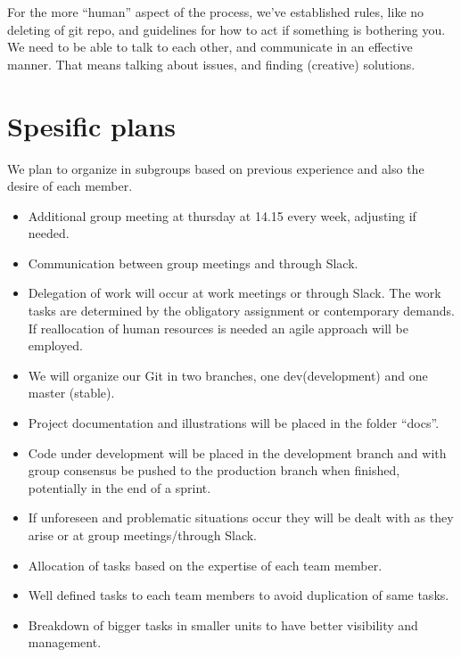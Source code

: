 \documentclass{article}
\begin{document}
For the more “human” aspect of the process, we’ve established rules, like no deleting of git repo, and guidelines for how to act if something is bothering you. We need to be able to talk to each other, and communicate in an effective manner. That means talking about issues, and finding (creative) solutions. 

\section*{Spesific plans}
 We plan to organize in subgroups based on previous experience and also the desire of each member.

\begin{itemize}
	
	

\item Additional group meeting at thursday at 14.15 every week, adjusting if needed.
\item Communication between group meetings and through Slack.
\item Delegation of work will occur at work meetings or through Slack. The work tasks are determined by the obligatory assignment or contemporary demands. If reallocation of human resources is needed an agile approach will be employed. 
\item We will organize our Git in two branches, one dev(development) and one master (stable).
\item Project documentation and illustrations will be placed in the folder “docs”. 
\item Code under development will be placed in the development branch and with group consensus be pushed to the production branch when finished, potentially in the end of a sprint.
\item If unforeseen and problematic situations occur they will be dealt with as they arise or at group meetings/through Slack.
\item Allocation of tasks based on the expertise of each team member.
\item Well defined tasks to each team members to avoid duplication of same tasks.
\item Breakdown of bigger tasks in smaller units to have better visibility and management. 
\end{itemize}
\end{document}
